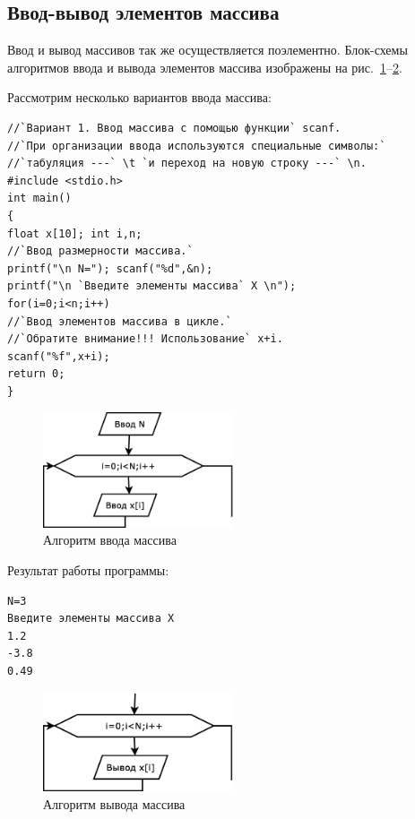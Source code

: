 \subsection[Ввод-вывод элементов массива]{Ввод-вывод элементов массива}
Ввод и вывод массивов так же осуществляется поэлементно. Блок-схемы алгоритмов ввода и вывода элементов массива
 изображены на рис.~\ref{ch05:refDrawing1}--\ref{ch05:refDrawing2}.

Рассмотрим несколько вариантов ввода массива:
\begin{lstlisting}
//`Вариант 1. Ввод массива с помощью функции` scanf.
//`При организации ввода используются специальные символы:`
//`табуляция ---` \t `и переход на новую строку ---` \n.
#include <stdio.h>
int main()
{
float x[10]; int i,n; 
//`Ввод размерности массива.`
printf("\n N="); scanf("%d",&n);
printf("\n `Введите элементы массива` X \n"); 
for(i=0;i<n;i++)
//`Ввод элементов массива в цикле.`
//`Обратите внимание!!! Использование` x+i.
scanf("%f",x+i);
return 0;
}
\end{lstlisting}

\begin{figure}[htb]
\begin{center}
\includegraphics[width=0.5\textwidth]{img/ris_5_2}
\caption{Алгоритм ввода массива }
\label{ch05:refDrawing1}
\end{center}
\end{figure}

Результат работы программы:
\begin{verbatim}
N=3
Введите элементы массива X 
1.2
-3.8
0.49
\end{verbatim}
\begin{figure}[htb]
\begin{center}
\includegraphics[width=0.5\textwidth]{img/ris_5_3}
\caption{Алгоритм вывода массива }
\label{ch05:refDrawing2}
\end{center}
\end{figure}

